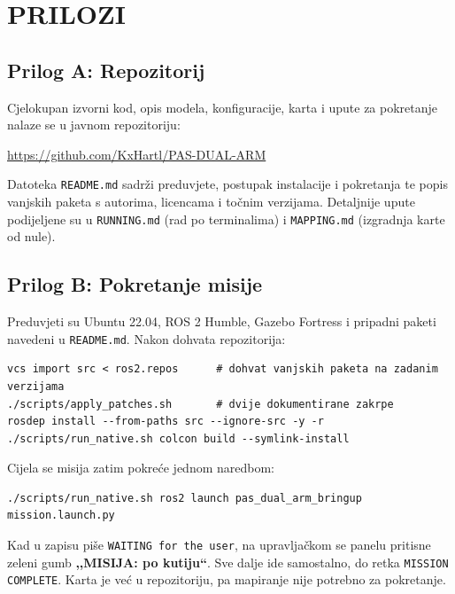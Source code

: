\documentclass[12pt,a4paper]{article}
\begin{document}
\newpage
\section*{PRILOZI}

\subsection*{Prilog A: Repozitorij}

Cjelokupan izvorni kod, opis modela, konfiguracije, karta i upute za pokretanje nalaze se u
javnom repozitoriju:

\begin{center}
\url{https://github.com/KxHartl/PAS-DUAL-ARM}
\end{center}

Datoteka \texttt{README.md} sadrži preduvjete, postupak instalacije i pokretanja te popis
vanjskih paketa s autorima, licencama i točnim verzijama. Detaljnije upute podijeljene su u
\texttt{RUNNING.md} (rad po terminalima) i \texttt{MAPPING.md} (izgradnja karte od nule).

\subsection*{Prilog B: Pokretanje misije}

Preduvjeti su Ubuntu 22.04, ROS 2 Humble, Gazebo Fortress i pripadni paketi navedeni u
\texttt{README.md}. Nakon dohvata repozitorija:

\begin{lstlisting}[style=log]
vcs import src < ros2.repos      # dohvat vanjskih paketa na zadanim verzijama
./scripts/apply_patches.sh       # dvije dokumentirane zakrpe
rosdep install --from-paths src --ignore-src -y -r
./scripts/run_native.sh colcon build --symlink-install
\end{lstlisting}

Cijela se misija zatim pokreće jednom naredbom:

\begin{lstlisting}[style=log]
./scripts/run_native.sh ros2 launch pas_dual_arm_bringup mission.launch.py
\end{lstlisting}

Kad u zapisu piše \texttt{WAITING for the user}, na upravljačkom se panelu pritisne zeleni gumb
\textbf{,,MISIJA: po kutiju``}. Sve dalje ide samostalno, do retka
\texttt{MISSION COMPLETE}. Karta je već u repozitoriju, pa mapiranje nije potrebno za
pokretanje.
\end{document}
